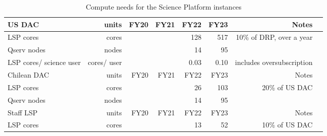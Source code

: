 \tiny \begin{longtable} { |p{}  |r  |r  |r  |r  |r  |r  |r |} 
\caption{Compute needs for the Science Platform instances \label{tab:lspSizing}}\\ 
\hline 
\textbf{US DAC}&\textbf{units}&\textbf{FY20}&\textbf{FY21}&\textbf{FY22}&\textbf{FY23}&\textbf{Notes} \\ \hline
{LSP cores}&{cores}&{}&{}&{128}&{517}&{10\% of DRP, over a year} \\ \hline
{Qserv nodes}&{nodes}&{}&{}&{14}&{95}& \\ \hline
{LSP cores/ science user}&{cores/ user}&{}&{}&{0.03}&{0.10}&{includes oversubscription} \\ \hline
{Chilean DAC}&{units}&{FY20}&{FY21}&{FY22}&{FY23}&{Notes} \\ \hline
{LSP cores}&{cores}&{}&{}&{26}&{103}&{20\% of US DAC} \\ \hline
{Qserv nodes}&{nodes}&{}&{}&{14}&{95}& \\ \hline
{Staff LSP}&{units}&{FY20}&{FY21}&{FY22}&{FY23}&{Notes} \\ \hline
{LSP cores}&{cores}&{}&{}&{13}&{52}&{10\% of US DAC} \\ \hline
\end{longtable} \normalsize
